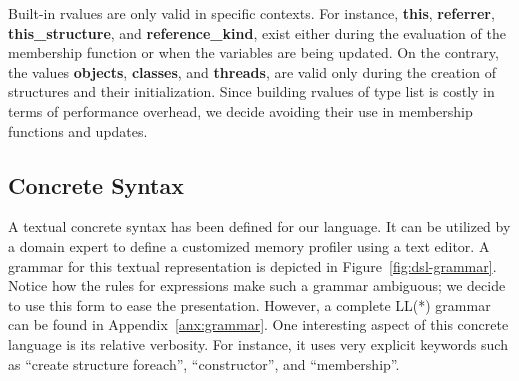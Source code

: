 Built-in rvalues are only valid in specific contexts.
For instance, \textbf{this}, \textbf{referrer}, \textbf{this\_structure}, and \textbf{reference\_kind}, exist either during the evaluation of the membership function or when the variables are being updated.
On the contrary, the values \textbf{objects}, \textbf{classes}, and \textbf{threads}, are valid only during the creation of structures and their initialization.
Since building rvalues of type list is costly in terms of performance overhead, we decide avoiding their use in membership functions and updates. 
 



\subsection{Concrete Syntax}\label{sec:concrete-syntax}

A textual concrete syntax has been defined for our language.
It can be utilized by a domain expert to define a customized memory profiler using a text editor.
A grammar for this textual representation is depicted in Figure~\ref{fig:dsl-grammar}.
Notice how the rules for expressions make such a grammar ambiguous; we decide to use this form to ease the presentation.
However, a complete LL(*) grammar~\cite{Parr:2011:LFA:1993498.1993548} can be found in Appendix~\ref{anx:grammar}.
One interesting aspect of this concrete language is its relative verbosity.
For instance, it uses very explicit keywords such as ``create structure foreach'', ``constructor'', and ``membership''.


